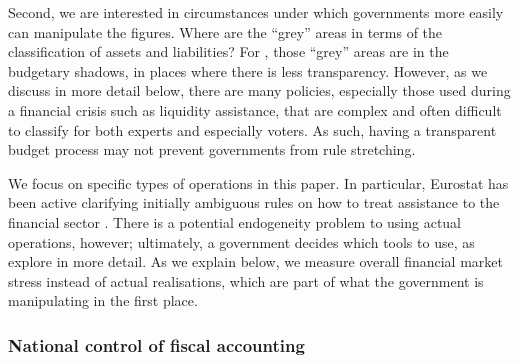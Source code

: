 \documentclass[]{article}
\begin{document}
Second, we are interested in circumstances under which governments more easily can manipulate the figures. Where are the ``grey'' areas in terms of the classification of assets and liabilities? For \cite{Alt2014}, those ``grey'' areas are in the budgetary shadows, in places where there is less transparency. However, as we discuss in more detail below, there are many policies, especially those used during a financial crisis such as liquidity assistance, that are complex and often difficult to classify for both experts and especially voters. As such, having a transparent budget process may not prevent governments from rule stretching.

We focus on specific types of operations in this paper. In particular, Eurostat has been active clarifying initially ambiguous rules on how to treat assistance to the financial sector \cite[see][]{GandrudHallerberg2016}. There is a potential endogeneity problem to using actual operations, however; ultimately, a government decides which tools to use, as \cite{GandrudHallerberg2016} explore in more detail. As we explain below, we measure overall financial market stress instead of actual realisations, which are part of what the government is manipulating in the first place.

\subsubsection{National control of fiscal accounting}

 \citep{bova2015rules}  \cite{GandrudHallerberg2016} 
\end{document}
